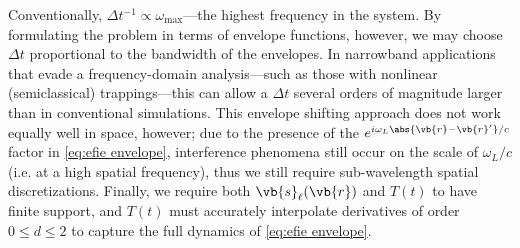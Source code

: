 \hrulefill

Conventionally, $\Delta t^{-1} \propto \omega_\text{max}$---the highest frequency in the system.
By formulating the problem in terms of envelope functions, however, we may choose $\Delta t$ proportional to the bandwidth of the envelopes.
In narrowband applications that evade a frequency-domain analysis---such as those with nonlinear (semiclassical) trappings---this can allow a $\Delta t$ several orders of magnitude larger than in conventional simulations.
This envelope shifting approach does not work equally well in space, however; due to the presence of the $e^{i \omega_L \abs{\vb{r} - \vb{r}'}/c}$ factor in \cref{eq:efie envelope}, interference phenomena still occur on the scale of $\omega_L/c$ (i.e. at a high spatial frequency), thus we still require sub-wavelength spatial discretizations.
Finally, we require both $\vb{s}_\ell(\vb{r})$ and $T(t)$ to have finite support, and $T(t)$ must accurately interpolate derivatives of order $0 \leqslant d \leqslant 2$ to capture the full dynamics of \cref{eq:efie envelope}.

